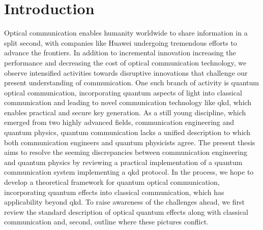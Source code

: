 \chapter*{Introduction}

Optical communication enables humanity worldwide to share information in a split second, with companies like Huawei undergoing tremendous efforts to advance the frontiers.
In addition to incremental innovation increasing the performance and decreasing the cost of optical communication technology, we observe intensified activities towards disruptive innovations that challenge our present understanding of communication.
One such branch of activity is quantum optical communication, incorporating quantum aspects of light into classical communication and leading to novel communication technology like \gls{qkd}, which enables practical and secure key generation.
As a still young discipline, which emerged from two highly advanced fields, communication engineering and quantum physics, quantum communication lacks a unified description to which both communication engineers and quantum physicists agree.
The present thesis aims to resolve the seeming discrepancies between communication engineering and quantum physics by reviewing a practical implementation of a quantum communication system implementing a \gls{qkd} protocol.
In the process, we hope to develop a theoretical framework for quantum optical communication, incorporating quantum effects into classical communication, which has applicability beyond \gls{qkd}.
To raise awareness of the challenges ahead, we first review the standard description of optical quantum effects along with classical communication and, second, outline where these pictures conflict.

